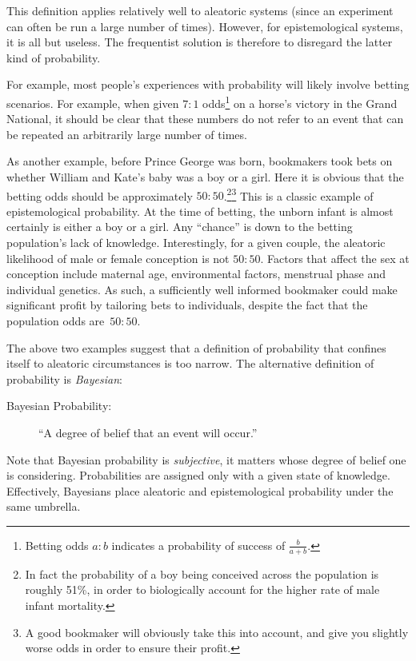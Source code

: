 This definition applies relatively well to aleatoric systems (since an experiment can often be run a large number of times). However, for epistemological systems, it is all but useless. The frequentist solution is therefore to disregard the latter kind of probability.

For example, most people's experiences with probability will likely involve betting scenarios. For example, when given \(7:1\) odds\footnote{Betting odds \(a:b\) indicates a probability of success of \(\frac{b}{a+b}\).} on a horse's victory in the Grand National, it should be clear that these numbers do not refer to an event that can be repeated an arbitrarily large number of times.

As another example, before Prince George was born, bookmakers took bets on whether William and Kate's baby was a boy or a girl. Here it is obvious that the betting odds should be approximately \(50:50\).\footnote{In fact the probability of a boy being conceived across the population is roughly 51\%, in order to biologically account for the higher rate of male infant mortality.}\footnote{A good bookmaker will obviously take this into account, and give you slightly worse odds in order to ensure their profit.} This is a classic example of epistemological probability. At the time of betting, the unborn infant is almost certainly is either a boy or a girl. Any ``chance'' is down to the betting population's lack of knowledge. Interestingly, for a given couple, the aleatoric likelihood of male or female conception is not \(50:50\). Factors that affect the sex at conception include maternal age, environmental factors, menstrual phase and individual genetics. As such, a sufficiently well informed bookmaker could make significant profit by tailoring bets to individuals, despite the fact that the population odds are~\(50:50\). 

The above two examples suggest that a definition of probability that confines itself to aleatoric circumstances is too narrow.
The alternative definition of probability is {\em Bayesian\/}:
\begin{description}
  \item[Bayesian Probability:] ``A degree of belief that an event will occur.'' 
\end{description}
Note that Bayesian probability is {\em subjective}, it matters whose degree of belief one is considering. Probabilities are assigned only with a given state of knowledge. Effectively, Bayesians place aleatoric and epistemological probability under the same umbrella. 

